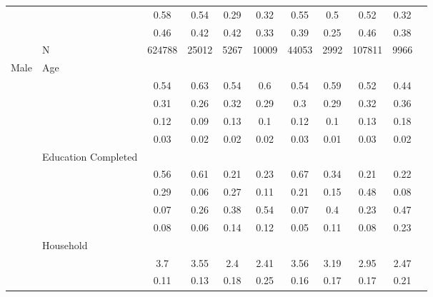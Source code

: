 \begin{table}[ht]
\begin{tabular}{l>{\raggedright\arraybackslash}p{3.2cm}|ccccccccc}
   & \multicolumn{1}{>{\raggedleft\arraybackslash}p{2.9cm}|}{\makebox[2.9cm][r]{Lives with Child }} & 0.58 & 0.54 & 0.29 & 0.32 & 0.55 & 0.5 & 0.52 & 0.32 \\ 
   & \multicolumn{1}{>{\raggedleft\arraybackslash}p{3.4cm}|}{\makebox[3.4cm][r]{Married/Cohabiting }} & 0.46 & 0.42 & 0.42 & 0.33 & 0.39 & 0.25 & 0.46 & 0.38 \\ 
   & N & 624788 & 25012 & 5267 & 10009 & 44053 & 2992 & 107811 & 9966 \\ 
  Male & Age &  &  &  &  &  &  &  &  \\ 
   & \multicolumn{1}{>{\raggedleft\arraybackslash}p{1.5cm}|}{\makebox[1.5cm][r]{60 - 69 }} & 0.54 & 0.63 & 0.54 & 0.6 & 0.54 & 0.59 & 0.52 & 0.44 \\ 
   & \multicolumn{1}{>{\raggedleft\arraybackslash}p{1.5cm}|}{\makebox[1.5cm][r]{70 - 79 }} & 0.31 & 0.26 & 0.32 & 0.29 & 0.3 & 0.29 & 0.32 & 0.36 \\ 
   & \multicolumn{1}{>{\raggedleft\arraybackslash}p{1.5cm}|}{\makebox[1.5cm][r]{80 - 89 }} & 0.12 & 0.09 & 0.13 & 0.1 & 0.12 & 0.1 & 0.13 & 0.18 \\ 
   & \multicolumn{1}{>{\raggedleft\arraybackslash}p{1.5cm}|}{\makebox[1.5cm][r]{90 plus }} & 0.03 & 0.02 & 0.02 & 0.02 & 0.03 & 0.01 & 0.03 & 0.02 \\ 
   & Education Completed &  &  &  &  &  &  &  &  \\ 
   & \multicolumn{1}{>{\raggedleft\arraybackslash}p{3.2cm}|}{\makebox[3.2cm][r]{Less than Primary }} & 0.56 & 0.61 & 0.21 & 0.23 & 0.67 & 0.34 & 0.21 & 0.22 \\ 
   & \multicolumn{1}{>{\raggedleft\arraybackslash}p{1.7cm}|}{\makebox[1.7cm][r]{Primary }} & 0.29 & 0.06 & 0.27 & 0.11 & 0.21 & 0.15 & 0.48 & 0.08 \\ 
   & \multicolumn{1}{>{\raggedleft\arraybackslash}p{2cm}|}{\makebox[2cm][r]{Secondary }} & 0.07 & 0.26 & 0.38 & 0.54 & 0.07 & 0.4 & 0.23 & 0.47 \\ 
   & \multicolumn{1}{>{\raggedleft\arraybackslash}p{2cm}|}{\makebox[2cm][r]{University }} & 0.08 & 0.06 & 0.14 & 0.12 & 0.05 & 0.11 & 0.08 & 0.23 \\ 
   & Household &  &  &  &  &  &  &  &  \\ 
   & \multicolumn{1}{>{\raggedleft\arraybackslash}p{2.7cm}|}{\makebox[2.7cm][r]{Household Size }} & 3.7 & 3.55 & 2.4 & 2.41 & 3.56 & 3.19 & 2.95 & 2.47 \\ 
   & \multicolumn{1}{>{\raggedleft\arraybackslash}p{2.2cm}|}{\makebox[2.2cm][r]{Lives Alone }} & 0.11 & 0.13 & 0.18 & 0.25 & 0.16 & 0.17 & 0.17 & 0.21 \\ 

\end{tabular}
\end{table}
